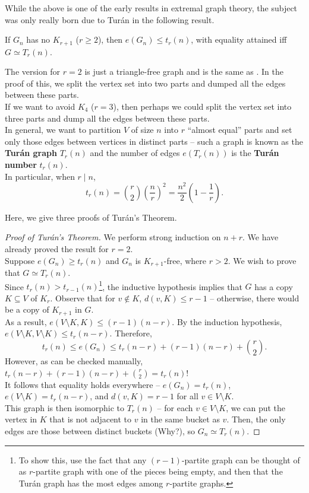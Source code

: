 		While the above is one of the early results in extremal graph theory, the subject was only really born due to Tur\'{a}n in the following result.

		\begin{ftheo}
			If $G_n$ has no $K_{r+1}$ ($r \ge 2$), then $e(G_n) \le t_r(n)$, with equality attained iff $G \simeq T_r(n)$.
		\end{ftheo}

		The version for $r=2$ is just a triangle-free graph and is the same as . In the proof of this, we split the vertex set into two parts and dumped all the edges between these parts.\\
		If we want to avoid $K_4$ ($r=3$), then perhaps we could split the vertex set into three parts and dump all the edges between these parts.\\
		In general, we want to partition $V$ of size $n$ into $r$ ``almost equal'' parts and set only those edges between vertices in distinct parts -- such a graph is known as the \textbf{Tur\'{a}n graph} $T_r(n)$ and the number of edges $e(T_r(n))$ is the \textbf{Tur\'{a}n number} $t_r(n)$.\\
		In particular, when $r \mid n$,
		\[ t_r(n) = \binom{r}{2} \left(\frac{n}{r}\right)^2 = \frac{n^2}{2} \left(1 - \frac{1}{r}\right). \]


		Here, we give three proofs of Tur\'{a}n's Theorem.

		\begin{proof}[Proof of Tur\'{a}n's Theorem]
			We perform strong induction on $n+r$. We have already proved the result for $r=2$.\\
			Suppose $e(G_n) \ge t_r(n)$ and $G_n$ is $K_{r+1}$-free, where $r > 2$. We wish to prove that $G \simeq T_r(n)$.\\
			Since $t_r(n) > t_{r-1}(n)$\footnote{To show this, use the fact that any $(r-1)$-partite graph can be thought of as $r$-partite graph with one of the pieces being empty, and then that the Tur\'{a}n graph has the most edges among $r$-partite graphs.}, the inductive hypothesis implies that $G$ has a copy $K \subseteq V$ of $K_r$. Observe that for $v \not\in K$, $d(v,K) \le r-1$ -- otherwise, there would be a copy of $K_{r+1}$ in $G$.\\
			As a result, $e(V \setminus K, K) \le (r-1)(n-r)$. By the induction hypothesis, $e(V\setminus K, V\setminus K) \le t_r(n-r)$. Therefore,
			\[ t_r(n) \le e(G_n) \le t_r(n-r) + (r-1)(n-r) + \binom{r}{2}. \]
			However, as can be checked manually, $t_r(n-r) + (r-1)(n-r) + \binom{r}{2} = t_r(n)$!\\
			It follows that equality holds everywhere -- $e(G_n) = t_r(n)$, $e(V \setminus K) = t_r(n-r)$, and $d(v,K) = r-1$ for all $v \in V \setminus K$.\\
			This graph is then isomorphic to $T_r(n)$ -- for each $v \in V \setminus K$, we can put the vertex in $K$ that is not adjacent to $v$ in the same bucket as $v$. Then, the only edges are those between distinct buckets (Why?), so $G_n \simeq T_r(n)$.
		\end{proof}

